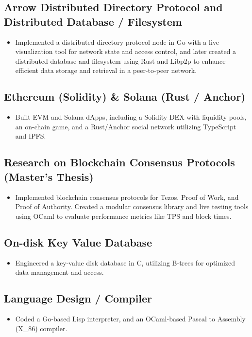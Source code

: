 \documentclass[a4paper, 12pt]{article}
\begin{document}
\subsection{Arrow Distributed Directory Protocol and Distributed Database / Filesystem}
\begin{itemize}
\item Implemented a distributed directory protocol node in Go with a live visualization tool for network state and access control, and later created a distributed database and filesystem using Rust and Libp2p to enhance efficient data storage and retrieval in a peer-to-peer network.
\end{itemize}

\subsection{Ethereum (Solidity) \& Solana (Rust / Anchor)}
\begin{itemize}
\item Built EVM and Solana dApps, including a Solidity DEX with liquidity pools, an on-chain game, and a Rust/Anchor social network utilizing TypeScript and IPFS.
\end{itemize}

\subsection{Research on Blockchain Consensus Protocols (Master's Thesis)}
\begin{itemize}
  \item Implemented blockchain consensus protocols for Tezos, Proof of Work, and Proof of Authority. Created a modular consensus library and live testing tools using OCaml to evaluate performance metrics like TPS and block times.
\end{itemize}

\subsection{On-disk Key Value Database}
\begin{itemize}
  \item Engineered a key-value disk database in C, utilizing B-trees for optimized data management and access.
\end{itemize}

\subsection{Language Design / Compiler}
\begin{itemize}
  \item Coded a Go-based Lisp interpreter, and an OCaml-based Pascal to Assembly (X\_86) compiler.
\end{itemize}
\end{document}

